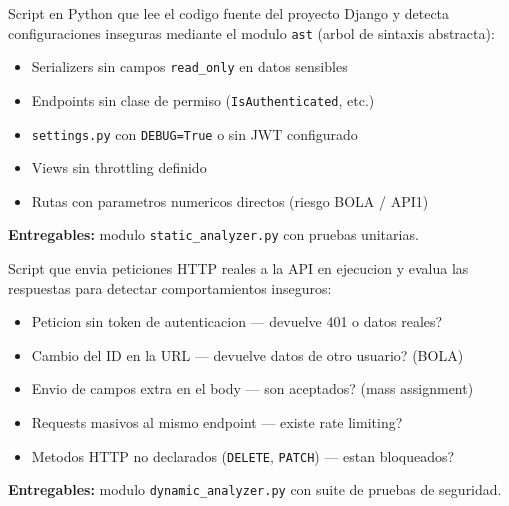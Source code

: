 \documentclass[12pt, a4paper]{article}
\begin{document}
\begin{successbox}[title={Fase 3 --- Modulo de analisis estatico}]
Script en Python que lee el codigo fuente del proyecto Django y detecta configuraciones inseguras mediante el modulo \texttt{ast} (arbol de sintaxis abstracta):

\begin{itemize}[leftmargin=1.5em, itemsep=2pt]
  \item Serializers sin campos \texttt{read\_only} en datos sensibles
  \item Endpoints sin clase de permiso (\texttt{IsAuthenticated}, etc.)
  \item \texttt{settings.py} con \texttt{DEBUG=True} o sin JWT configurado
  \item Views sin throttling definido
  \item Rutas con parametros numericos directos (riesgo BOLA / API1)
\end{itemize}

\smallskip
\textbf{Entregables:} modulo \texttt{static\_analyzer.py} con pruebas unitarias.
\end{successbox}

\begin{warningbox}[title={Fase 4 --- Modulo de analisis dinamico}]
Script que envia peticiones HTTP reales a la API en ejecucion y evalua las respuestas para detectar comportamientos inseguros:

\begin{itemize}[leftmargin=1.5em, itemsep=2pt]
  \item Peticion sin token de autenticacion --- devuelve 401 o datos reales?
  \item Cambio del ID en la URL --- devuelve datos de otro usuario? (BOLA)
  \item Envio de campos extra en el body --- son aceptados? (mass assignment)
  \item Requests masivos al mismo endpoint --- existe rate limiting?
  \item Metodos HTTP no declarados (\texttt{DELETE}, \texttt{PATCH}) --- estan bloqueados?
\end{itemize}

\smallskip
\textbf{Entregables:} modulo \texttt{dynamic\_analyzer.py} con suite de pruebas de seguridad.
\end{warningbox}
\end{document}
